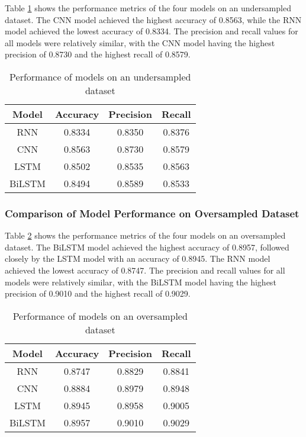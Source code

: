 \documentclass[12pt, a4paper]{article}
\begin{document}
Table \ref{tab:neural_undersampled_results} shows the performance metrics of the four models on an undersampled dataset. The CNN model achieved the highest accuracy of 0.8563, while the RNN model achieved the lowest accuracy of 0.8334. The precision and recall values for all models were relatively similar, with the CNN model having the highest precision of 0.8730 and the highest recall of 0.8579.
\newline
\begin{center}
\begin{table}[ht]
\centering
\begin{tabular}{|c|c|c|c|}
\hline
\textbf{Model} & \textbf{Accuracy} & \textbf{Precision} & \textbf{Recall} \\
\hline
RNN & 0.8334 & 0.8350 & 0.8376 \\
CNN & 0.8563 & 0.8730 & 0.8579 \\
LSTM & 0.8502 & 0.8535 & 0.8563 \\
BiLSTM & 0.8494 & 0.8589 & 0.8533 \\
\hline
\end{tabular}
\caption{Performance of models on an undersampled dataset}
\label{tab:neural_undersampled_results}
\end{table}
\end{center}

\subsubsection{Comparison of Model Performance on Oversampled Dataset}

Table \ref{tab:neural_oversampled_results} shows the performance metrics of the four models on an oversampled dataset. The BiLSTM model achieved the highest accuracy of 0.8957, followed closely by the LSTM model with an accuracy of 0.8945. The RNN model achieved the lowest accuracy of 0.8747. The precision and recall values for all models were relatively similar, with the BiLSTM model having the highest precision of 0.9010 and the highest recall of 0.9029.
\newline
\begin{center}
\begin{table}[ht]
\centering
\begin{tabular}{|c|c|c|c|}
\hline
\textbf{Model} & \textbf{Accuracy} & \textbf{Precision} & \textbf{Recall} \\
\hline
RNN & 0.8747 & 0.8829 & 0.8841 \\
CNN & 0.8884 & 0.8979 & 0.8948 \\
LSTM & 0.8945 & 0.8958 & 0.9005 \\
BiLSTM & 0.8957 & 0.9010 & 0.9029 \\
\hline
\end{tabular}
\caption{Performance of models on an oversampled dataset}
\label{tab:neural_oversampled_results}
\end{table}
\end{center}
\end{document}
